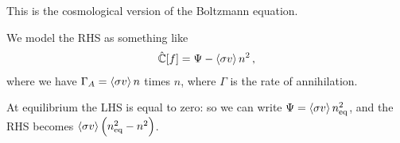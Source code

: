 \documentclass[main.tex]{subfiles}
\begin{document}
This is the cosmological version of the Boltzmann equation. 

We model the RHS as something like 
%
\begin{align}
  \hat{\mathbb{C}}[f] = \Psi - \expval{\sigma v } n^2
\,,
\end{align}
%
where we have \(\Gamma_A = \expval{\sigma v} n\) times \(n\), where \(\Gamma \) is the rate of annihilation. 

At equilibrium the LHS is 
equal to zero: so we can write \(\Psi = \expval{\sigma v} n^2 _{\text{eq}}\), and the RHS becomes \(\expval{\sigma v} \qty(n^2 _{\text{eq}} - n^2)\).
\end{document}
